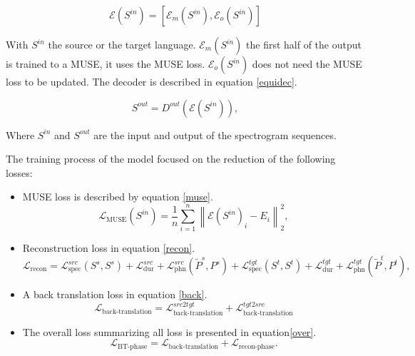 \documentclass[12pt]{article}
\begin{document}
\begin{equation}
\mathcal{E}(S^{in}) = \left[ \mathcal{E}_m(S^{in}), \mathcal{E}_o(S^{in}) \right]
\label{equien}
\end{equation}

With $S^{in}$ the source or the target language. $\mathcal{E}_{m}(S^{in})$ the first half of the output is trained to a MUSE, it uses the MUSE loss. $\mathcal{E}_{o}(S^{in})$ does not need the MUSE loss to be updated.
The decoder is described in equation \ref{equidec}.


\begin{equation}
S^{out} = D^{out} \left( \mathcal{E}(S^{in}) \right),
\label{equidec}
\end{equation}

Where $S^{in}$ and  $S^{out}$ are the input and output of the spectrogram sequences.

The training process of the model focused on the reduction of the following losses:

\begin{itemize}
\item MUSE loss is described by equation \ref{muse}.
\begin{equation}
\mathcal{L}_{\text{MUSE}}(S^{in}) = \frac{1}{n} \sum_{i=1}^n \left\| \mathcal{E}(S^{in})_i - E_i \right\|_2^2,
\label{muse}
\end{equation}

\item Reconstruction loss in equation \ref{recon}.
\begin{equation}
\mathcal{L}_{\text{recon}} = \mathcal{L}_{\text{spec}}^{src}(S^s, S^s) + \mathcal{L}_{\text{dur}}^{src} + \mathcal{L}_{\text{phn}}^{src}(\tilde{P}^s, P^s) + \mathcal{L}_{\text{spec}}^{tgt}(S^t, S^t) + \mathcal{L}_{\text{dur}}^{tgt} + \mathcal{L}_{\text{phn}}^{tgt}(\tilde{P}^t, P^t),
\label{recon}
\end{equation}

\item A back translation loss in equation \ref{back}.
\begin{equation}
\mathcal{L}_{\text{back-translation}} = \mathcal{L}_{\text{back-translation}}^{src2tgt} + \mathcal{L}_{\text{back-translation}}^{tgt2src}
\label{back}
\end{equation}

\item The overall loss summarizing all loss is presented in equation\ref{over}.
\begin{equation}
\mathcal{L}_{\text{BT-phase}} = \mathcal{L}_{\text{back-translation}} + \mathcal{L}_{\text{recon-phase}}.
\label{over}
\end{equation}

\end{itemize}
\end{document}
